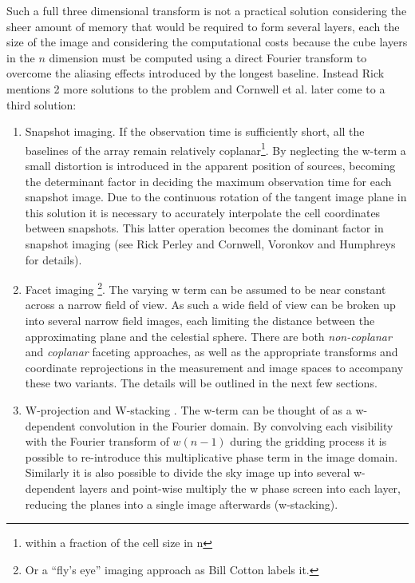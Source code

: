 Such a full three dimensional transform is not a practical solution considering the sheer amount of memory that would be required to form several layers,
each the size of the image and considering the computational costs because the cube layers in the $n$ dimension must be computed using a direct Fourier 
transform to overcome the aliasing effects introduced by the longest baseline. Instead Rick \cite[Lecture 19]{taylor1999synthesis} mentions 2 more 
solutions to the problem and Cornwell et al. \cite{cornwell2008noncoplanar} later come to a third solution:
\begin{enumerate}
 \item Snapshot imaging. If the observation time is sufficiently short, all the baselines of the array remain relatively coplanar\footnote{within a 
 fraction of the cell size in n}. By neglecting the w-term a small distortion is introduced in the apparent position of sources, becoming the determinant
 factor in deciding the maximum observation time for each snapshot image. Due to the continuous rotation of the tangent image plane in this solution it is necessary
 to accurately interpolate the cell coordinates between snapshots. This latter operation becomes the dominant factor in snapshot imaging (see Rick Perley \cite[Lecture 19]{taylor1999synthesis}
 and Cornwell, Voronkov and Humphreys \cite{cornwell2012wide} for details).
 \item Facet imaging \footnote{Or a ``fly's eye'' imaging approach as Bill Cotton labels it.}. The varying w term can be assumed to be near constant across a narrow field of view. As such a wide field of view can be broken
 up into several narrow field images, each limiting the distance between the approximating plane and the celestial sphere. There are both \emph{non-coplanar} and \emph{coplanar}
 faceting approaches, as well as the appropriate transforms and coordinate reprojections in the measurement and image spaces to accompany these two variants. The details will be 
 outlined in the next few sections.
 \item W-projection \cite{cornwell2008noncoplanar} and W-stacking \cite{offringa2014wsclean}. The w-term can be thought of as a w-dependent convolution
 in the Fourier domain. By convolving each visibility with the Fourier transform of $w(n-1)$ during the gridding process it is possible to re-introduce 
 this multiplicative phase term in the image domain. Similarly it is also possible to divide the sky image up into several w-dependent layers and point-wise
 multiply the w phase screen into each layer, reducing the planes into a single image afterwards (w-stacking).
\end{enumerate}

